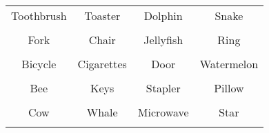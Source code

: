\documentclass[12pt,a4paper]{article}
\begin{document}
\thispagestyle{empty}
\begin{table}[]
\centering
\Huge
\begin{tabular}{cccc}
 Toothbrush& Toaster& Dolphin& Snake\\  & & & \\
 Fork& Chair& Jellyfish& Ring\\  & & & \\
 Bicycle& Cigarettes& Door& Watermelon\\  & & & \\
 Bee& Keys& Stapler& Pillow\\  & & & \\
 Cow& Whale& Microwave& Star\\  & & & \\
\end{tabular}
\end{table}
\end{document}
